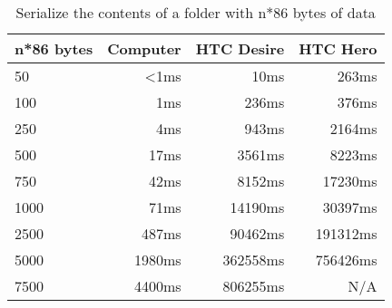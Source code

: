 \begin{table}
  \centering
  \caption{Serialize the contents of a folder with n*86 bytes of data}
  \begin{tabular}{ | l | r | r | r |}
    \hline
    \textbf{n*86 bytes} & \textbf{Computer} & \textbf{HTC Desire} & \textbf{HTC Hero} \\ \hline
    50      & <1ms      &10ms     & 263ms       \\ \hline
    100     & 1ms       &236ms    & 376ms       \\ \hline
    250     & 4ms       &943ms    & 2164ms      \\ \hline   
    500     & 17ms      &3561ms   & 8223ms      \\ \hline
    750     & 42ms      &8152ms   & 17230ms     \\ \hline
    1000    & 71ms      &14190ms  & 30397ms     \\ \hline
    2500    & 487ms     &90462ms  & 191312ms    \\ \hline     
    5000    & 1980ms    &362558ms & 756426ms    \\ \hline 
    7500    & 4400ms    &806255ms & N/A         \\ \hline 
  \end{tabular}
  \label{tbl:folder:serializefolder}
\end{table}
